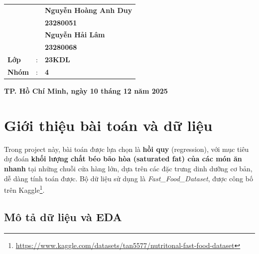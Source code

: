 \documentclass[12pt,a4paper]{article}
\begin{document}
\begin{titlepage}
\begin{center}
\begin{tabular}{@{}l c l@{}}
                                   &   & \textbf{Nguyễn Hoàng Anh Duy} \\
                                   &   & \textbf{23280051} \\[0.2cm]

                                   &   & \textbf{Nguyễn Hải Lâm} \\
                                   &   & \textbf{23280068} \\[0.5cm]

        \textbf{Lớp} & : & \textbf{23KDL} \\
        \textbf{Nhóm} & : & \textbf{4} 
    \end{tabular}
    \end{center}

    \vfill
    \begin{center}
        \textbf{TP. Hồ Chí Minh, ngày 10 tháng 12 năm 2025}
    \end{center}

    \vspace*{1cm}
\end{titlepage}


\tableofcontents
\newpage

\section{Giới thiệu bài toán và dữ liệu}
\label{sec:intro_dataset}

Trong project này, bài toán được lựa chọn là \textbf{hồi quy} (regression), với mục tiêu dự đoán \textbf{khối lượng chất béo bão hòa (saturated fat) của các món ăn nhanh} tại những chuỗi cửa hàng lớn, dựa trên các đặc trưng dinh dưỡng cơ bản, dễ dàng tính toán được. Bộ dữ liệu sử dụng là \textit{Fast\_Food\_Dataset}, được công bố trên Kaggle\footnote{\url{https://www.kaggle.com/datasets/tan5577/nutritonal-fast-food-dataset}}.

\subsection{Mô tả dữ liệu và EDA}
\end{document}
